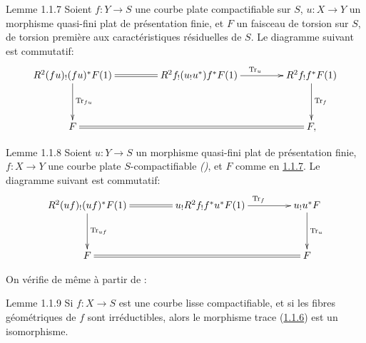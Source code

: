\documentclass[10pt]{../fichiers-configuration-latex/smfart}
\begin{document}
\begin{enonce*}{Lemme 1.1.7}
Soient $f:Y\rightarrow S$ une courbe plate compactifiable sur $S$,
$u:X\rightarrow Y$ un morphisme quasi-fini plat de présentation finie,
et $F$ un faisceau de torsion sur $S$, de torsion première aux
caractéristiques résiduelles de $S$. Le diagramme suivant est
commutatif:
$$
\xymatrix@C=1.5cm@R=1.25cm{
R^2(fu)_! (fu)^{\ast}F(1) \ar[d]^{\Tr_{fu}}\ar@{=}[r]& R^2f_!(u_!
u^{\ast})f^{\ast}F(1) \ar[r]^{\Tr_u}& R^2f_!f^{\ast}F(1)\ar[d]^{\Tr_f} \\
F     \ar@{=}[rr] &&  F,
}
$$
\end{enonce*}

\begin{enonce*}{Lemme 1.1.8}
Soient $u:Y\rightarrow S$ un morphisme quasi-fini plat de présentation
finie, $f:X\rightarrow Y$ une courbe plate $S$-compactifiable
\emph{()}, et $F$ comme en \hyperref[XVIII.lem1.1.7]{1.1.7}. Le
diagramme suivant est commutatif:
$$
\xymatrix@C=1.5cm@R=1.25cm{
R^{2}(uf)_! (uf)^{\ast}F(1)  \ar@{=}[r] \ar[d]^{\Tr_{uf}}&
u_!R^2f_!f^{\ast} u^{\ast}F(1) \ar[r]^{\Tr_f} &
u_!u^{\ast}F \ar[d]^{\Tr_u}\\
F        \ar@{=}[rr] & &  F
}
$$
\end{enonce*}

On vérifie de même à partir de :

\begin{enonce*}{Lemme 1.1.9}
Si $f:X\rightarrow S$ est une courbe lisse compactifiable, et si les
fibres géométriques de $f$ sont irréductibles, alors le morphisme
trace (\hyperref[XVIII.prop1.1.6]{1.1.6}) est un isomorphisme.
\end{enonce*}
\end{document}
